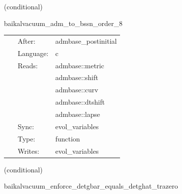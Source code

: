 \vspace{5mm}

   (conditional) 

\hspace{5mm} baikalvacuum\_adm\_to\_bssn\_order\_8 

\hspace{5mm}{\it convert initial data into bssn variables } 


\hspace{5mm}

 \begin{tabular*}{160mm}{cll} 
~ & After:  & admbase\_postinitial \\ 
~ & Language:  & c \\ 
~ & Reads:  & admbase::metric \\ 
~& ~ &admbase::shift\\ 
~& ~ &admbase::curv\\ 
~& ~ &admbase::dtshift\\ 
~& ~ &admbase::lapse\\ 
~ & Sync:  & evol\_variables \\ 
~ & Type:  & function \\ 
~ & Writes:  & evol\_variables \\ 
\end{tabular*} 


\vspace{5mm}

   (conditional) 

\hspace{5mm} baikalvacuum\_enforce\_detgbar\_equals\_detghat\_trazero 

\hspace{5mm}{\it project freshly initialized or restored bssn/fccz4 state } 


\hspace{5mm}

